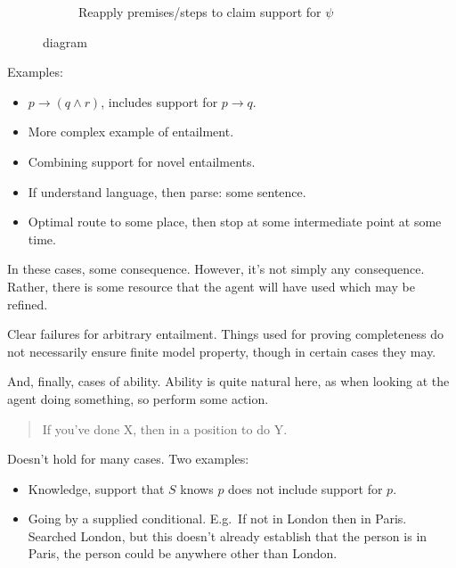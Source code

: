 \begin{note}
\begin{figure}[H]
\begin{subfigure}{.45\textwidth}
      \caption{Reapply premises/steps to claim support for \(\psi\)}
    \end{subfigure}
    \caption{\incl{} diagram}
  \end{figure}

  Examples:
  \begin{itemize}
  \item \(p \rightarrow (q \land r)\), includes support for \(p \rightarrow q\).
  \item More complex example of entailment.
  \item Combining support for novel entailments.
  \item If understand language, then parse: some sentence.
  \item Optimal route to some place, then stop at some intermediate point at some time.
  \end{itemize}
  In these cases, some consequence.
  However, it's not simply any consequence.
  Rather, there is some resource that the agent will have used which may be refined.

  Clear failures for arbitrary entailment.
  Things used for proving completeness do not necessarily ensure finite model property, though in certain cases they may.

  And, finally, cases of ability.
  Ability is quite natural here, as when looking at the agent doing something, so perform some action.

  \begin{quote}
    If you've done X, then in a position to do Y.
  \end{quote}

  Doesn't hold for many cases.
  Two examples:
  \begin{itemize}
  \item Knowledge, support that \(S\) knows \(p\) does not include support for \(p\).
  \item Going by a supplied conditional.
    E.g.\ If not in London then in Paris.
    Searched London, but this doesn't already establish that the person is in Paris, the person could be anywhere other than London.
  \end{itemize}
\end{note}

